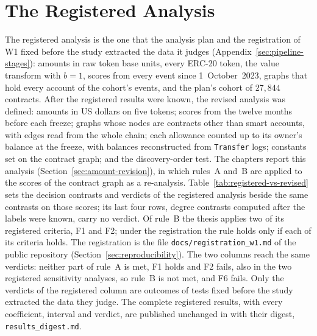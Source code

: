 \section{The Registered Analysis}
\label{sec:map-registered}



The registered analysis is the one that the analysis plan and the registration of W1 fixed before the study extracted the data it judges (Appendix~\ref{sec:pipeline-stages}): amounts in raw token base units, every ERC-20 token, the value transform with $b=1$, scores from every event since 1~October~2023, graphs that hold every account of the cohort's events, and the plan's cohort of $27{,}844$ contracts. After the registered results were known, the revised analysis was defined: amounts in US dollars on five tokens; scores from the twelve months before each freeze; graphs whose nodes are contracts other than smart accounts, with edges read from the whole chain; each allowance counted up to its owner's balance at the freeze, with balances reconstructed from \texttt{Transfer} logs; constants set on the contract graph; and the discovery-order test. The chapters report this analysis (Section~\ref{sec:amount-revision}), in which rules~A and~B are applied to the scores of the contract graph as a re-analysis. Table~\ref{tab:registered-vs-revised} sets the decision contrasts and verdicts of the registered analysis beside the same contrasts on those scores; its last four rows, degree contrasts computed after the labels were known, carry no verdict. Of rule~B the thesis applies two of its registered criteria, F1 and F2; under the registration the rule holds only if each of its criteria holds. The registration is the file \texttt{docs/registration\_w1.md} of the public repository (Section~\ref{sec:reproducibility}). The two columns reach the same verdicts: neither part of rule~A is met, F1 holds and F2 fails, also in the two registered sensitivity analyses, so rule~B is not met, and F6 fails. Only the verdicts of the registered column are outcomes of tests fixed before the study extracted the data they judge. The complete registered results, with every coefficient, interval and verdict, are published unchanged in  with their digest, \texttt{results\_digest.md}.
